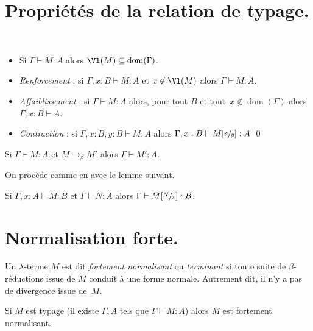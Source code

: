 \documentclass[./main]{subfiles}
\begin{document}
  \section{Propriétés de la relation de typage.}

  \begin{lem}
    ~\\[-1.5\baselineskip]

    \begin{itemize}
      \item Si $\Gamma \vdash M : A$ alors $\Vl(M) \subseteq \operatorname{dom}(\Gamma)$.
      \item \textit{Renforcement} : si $\Gamma , x : B \vdash M : A$ et $x \not\in \Vl(M)$ alors $\Gamma \vdash M : A$.
      \item \textit{Affaiblissement} : si $\Gamma \vdash M : A$ alors, pour tout $B$ et tout~$x \not\in \operatorname{dom}(\Gamma)$ alors~$\Gamma, x : B \vdash A$.
      \item \textit{Contraction} : si $\Gamma, x : B, y : B \vdash M : A$ alors $\Gamma, x : B \vdash M[\sfrac{x}{y}] : A$ \qed
    \end{itemize}
  \end{lem}

  \begin{prop}
    Si $\Gamma \vdash M : A$ et $M \to_\beta M'$ alors $\Gamma \vdash M' : A$.
  \end{prop}
  \begin{prv}
    On procède comme en  avec le lemme suivant.
    \begin{lem}
      Si $\Gamma, x : A \vdash M : B$ et $\Gamma \vdash N : A$ alors $\Gamma \vdash M[\sfrac{N}{x}] : B$.
    \end{lem}
  \end{prv}

  \section{Normalisation forte.}

  \begin{defn}
    Un $\lambda$-terme $M$ est dit \textit{fortement normalisant} ou \textit{terminant} si toute suite de $\beta$-réductions issue de $M$ conduit à une forme normale. Autrement dit, il n'y a pas de divergence issue de~$M$.
  \end{defn}

  \begin{thm}
    Si $M$ est typage (il existe $\Gamma, A$ tels que  $\Gamma \vdash M : A$) alors $M$ est fortement normalisant.
  \end{thm}
\end{document}
